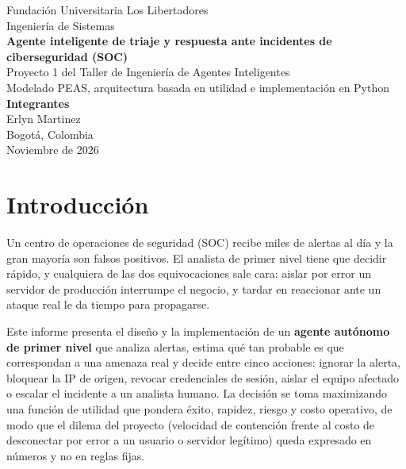 \documentclass[11pt,a4paper]{article}
\begin{document}
\begin{titlepage}
\centering
\vspace*{1.5cm}
{\large Fundación Universitaria Los Libertadores}\\[0.3cm]
{\large Ingeniería de Sistemas}\\[2.5cm]
{\Huge\bfseries Agente inteligente de triaje y respuesta ante incidentes de ciberseguridad (SOC)}\\[1.2cm]
{\Large Proyecto 1 del Taller de Ingeniería de Agentes Inteligentes}\\[0.4cm]
{\large Modelado PEAS, arquitectura basada en utilidad e implementación en Python}\\[3cm]
{\large\textbf{Integrantes}}\\[0.2cm]
{\large Erlyn Martinez}\\[2cm]
{\large Bogotá, Colombia}\\
{\large Noviembre de 2026}
\vfill
\end{titlepage}

\tableofcontents
\clearpage

\section{Introducción}

Un centro de operaciones de seguridad (SOC) recibe miles de alertas al día y la gran mayoría son falsos positivos. El analista de primer nivel tiene que decidir rápido, y cualquiera de las dos equivocaciones sale cara: aislar por error un servidor de producción interrumpe el negocio, y tardar en reaccionar ante un ataque real le da tiempo para propagarse.

Este informe presenta el diseño y la implementación de un \textbf{agente autónomo de primer nivel} que analiza alertas, estima qué tan probable es que correspondan a una amenaza real y decide entre cinco acciones: ignorar la alerta, bloquear la IP de origen, revocar credenciales de sesión, aislar el equipo afectado o escalar el incidente a un analista humano. La decisión se toma maximizando una función de utilidad que pondera éxito, rapidez, riesgo y costo operativo, de modo que el dilema del proyecto (velocidad de contención frente al costo de desconectar por error a un usuario o servidor legítimo) queda expresado en números y no en reglas fijas.
\end{document}
